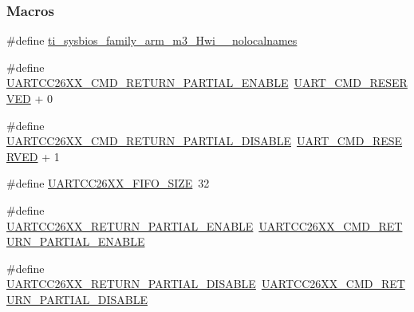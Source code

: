 \subsubsection*{Macros}
\begin{DoxyCompactItemize}
\item 
\#define \hyperlink{_u_a_r_t_c_c26_x_x_8h_aaa17ecf48f5762e2e1bdb0bab8aacf0c}{ti\+\_\+sysbios\+\_\+family\+\_\+arm\+\_\+m3\+\_\+\+Hwi\+\_\+\+\_\+nolocalnames}
\item 
\#define \hyperlink{_u_a_r_t_c_c26_x_x_8h_a90f59d674fd3b290c3dd711128413014}{U\+A\+R\+T\+C\+C26\+X\+X\+\_\+\+C\+M\+D\+\_\+\+R\+E\+T\+U\+R\+N\+\_\+\+P\+A\+R\+T\+I\+A\+L\+\_\+\+E\+N\+A\+B\+L\+E}~\hyperlink{_u_a_r_t_8h_a0f5a809e0884da33fef102236eb51644}{U\+A\+R\+T\+\_\+\+C\+M\+D\+\_\+\+R\+E\+S\+E\+R\+V\+E\+D} + 0
\item 
\#define \hyperlink{_u_a_r_t_c_c26_x_x_8h_a7cc7c1551022a60bd310c79acb6b26b8}{U\+A\+R\+T\+C\+C26\+X\+X\+\_\+\+C\+M\+D\+\_\+\+R\+E\+T\+U\+R\+N\+\_\+\+P\+A\+R\+T\+I\+A\+L\+\_\+\+D\+I\+S\+A\+B\+L\+E}~\hyperlink{_u_a_r_t_8h_a0f5a809e0884da33fef102236eb51644}{U\+A\+R\+T\+\_\+\+C\+M\+D\+\_\+\+R\+E\+S\+E\+R\+V\+E\+D} + 1
\item 
\#define \hyperlink{_u_a_r_t_c_c26_x_x_8h_aa3cbdad922e595319c76870add0d41e6}{U\+A\+R\+T\+C\+C26\+X\+X\+\_\+\+F\+I\+F\+O\+\_\+\+S\+I\+Z\+E}~32
\item 
\#define \hyperlink{_u_a_r_t_c_c26_x_x_8h_a681da30c89054d687603b864792894f7}{U\+A\+R\+T\+C\+C26\+X\+X\+\_\+\+R\+E\+T\+U\+R\+N\+\_\+\+P\+A\+R\+T\+I\+A\+L\+\_\+\+E\+N\+A\+B\+L\+E}~\hyperlink{_u_a_r_t_c_c26_x_x_8h_a90f59d674fd3b290c3dd711128413014}{U\+A\+R\+T\+C\+C26\+X\+X\+\_\+\+C\+M\+D\+\_\+\+R\+E\+T\+U\+R\+N\+\_\+\+P\+A\+R\+T\+I\+A\+L\+\_\+\+E\+N\+A\+B\+L\+E}
\item 
\#define \hyperlink{_u_a_r_t_c_c26_x_x_8h_a973b0815d1f88dc3f3e7191625783b99}{U\+A\+R\+T\+C\+C26\+X\+X\+\_\+\+R\+E\+T\+U\+R\+N\+\_\+\+P\+A\+R\+T\+I\+A\+L\+\_\+\+D\+I\+S\+A\+B\+L\+E}~\hyperlink{_u_a_r_t_c_c26_x_x_8h_a7cc7c1551022a60bd310c79acb6b26b8}{U\+A\+R\+T\+C\+C26\+X\+X\+\_\+\+C\+M\+D\+\_\+\+R\+E\+T\+U\+R\+N\+\_\+\+P\+A\+R\+T\+I\+A\+L\+\_\+\+D\+I\+S\+A\+B\+L\+E}
\end{DoxyCompactItemize}
